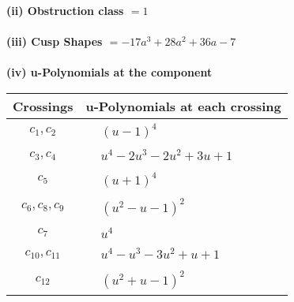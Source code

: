 \documentclass[1p]{elsarticle_modified}
\theoremstyle{definition}
\begin{document}
\flushleft \textbf{(ii) Obstruction class $= 1$}\\~\\
\flushleft \textbf{(iii) Cusp Shapes $= -17 a^3+28 a^2+36 a-7$}\\~\\
\newpage\renewcommand{\arraystretch}{1}
\flushleft \textbf{(iv) u-Polynomials at the component}\newline \\
\begin{tabular}{m{50pt}|m{274pt}}
Crossings & \hspace{64pt}u-Polynomials at each crossing \\
\hline $$\begin{aligned}c_{1},c_{2}\end{aligned}$$&$\begin{aligned}
&(u-1)^4
\end{aligned}$\\
\hline $$\begin{aligned}c_{3},c_{4}\end{aligned}$$&$\begin{aligned}
&u^4-2 u^3-2 u^2+3 u+1
\end{aligned}$\\
\hline $$\begin{aligned}c_{5}\end{aligned}$$&$\begin{aligned}
&(u+1)^4
\end{aligned}$\\
\hline $$\begin{aligned}c_{6},c_{8},c_{9}\end{aligned}$$&$\begin{aligned}
&(u^2- u-1)^2
\end{aligned}$\\
\hline $$\begin{aligned}c_{7}\end{aligned}$$&$\begin{aligned}
&u^4
\end{aligned}$\\
\hline $$\begin{aligned}c_{10},c_{11}\end{aligned}$$&$\begin{aligned}
&u^4- u^3-3 u^2+u+1
\end{aligned}$\\
\hline $$\begin{aligned}c_{12}\end{aligned}$$&$\begin{aligned}
&(u^2+u-1)^2
\end{aligned}$\\
\hline
\end{tabular}\\~\\
\end{document}
